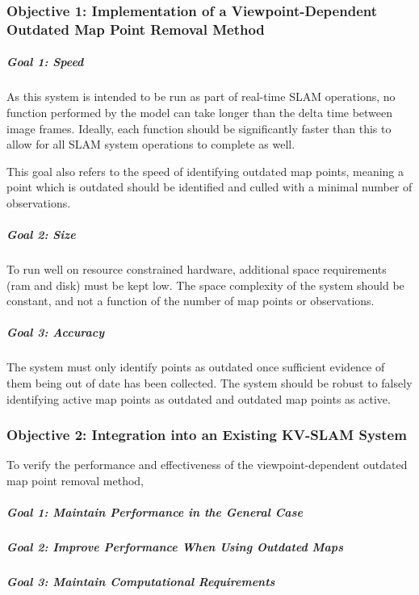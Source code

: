 \subsubsection*{Objective 1: Implementation of a Viewpoint-Dependent Outdated Map Point Removal Method}

\subparagraph{Goal 1: Speed}

As this system is intended to be run as part of real-time SLAM operations, no function performed by the model can take longer than the delta time between image frames. Ideally, each function should be significantly faster than this to allow for all SLAM system operations to complete as well.

This goal also refers to the speed of identifying outdated map points, meaning a point which is outdated should be identified and culled with a minimal number of observations.

\subparagraph{Goal 2: Size}

To run well on resource constrained hardware, additional space requirements (ram and disk) must be kept low. The space complexity of the system should be constant, and not a function of the number of map points or observations.

\subparagraph{Goal 3: Accuracy}

The system must only identify points as outdated once sufficient evidence of them being out of date has been collected. The system should be robust to falsely identifying active map points as outdated and outdated map points as active.

\subsubsection*{Objective 2: Integration into an Existing KV-SLAM System}

To verify the performance and effectiveness of the viewpoint-dependent outdated map point removal method, 

\subparagraph{Goal 1: Maintain Performance in the General Case}
\subparagraph{Goal 2: Improve Performance When Using Outdated Maps}
\subparagraph{Goal 3: Maintain Computational Requirements}




